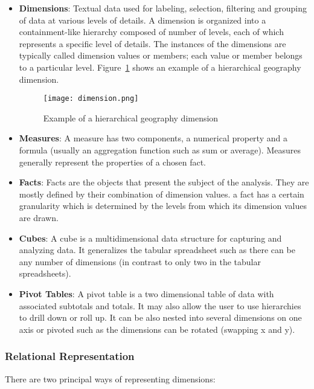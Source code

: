\begin{itemize}
	\item \textbf{Dimensions}: Textual data used for labeling, selection, filtering and grouping of data at various levels of details. A dimension is organized into a containment-like hierarchy composed of number of levels, each of which represents a specific level of details. The instances of the dimensions are typically called dimension values or members; each value or member belongs to a particular level. Figure~\ref{fig:dimension} shows an example of a hierarchical geography dimension.

\begin{figure}[htbp]
\centering
	\texttt{[image: dimension.png]}
	\caption{Example of a hierarchical geography dimension}
	\label{fig:dimension}
\end{figure}

	\item \textbf{Measures}: A measure has two components, a numerical property and a formula (usually an aggregation function such as sum or average). Measures generally represent the properties of a chosen fact.
	\item \textbf{Facts}: Facts are the objects that present the subject of the analysis. They are mostly defined by their combination of dimension values. a fact has a certain granularity which is determined by the levels from which its dimension values are drawn.
	\item \textbf{Cubes}: A cube is a multidimensional data structure for capturing and analyzing data. It generalizes the tabular spreadsheet such as there can be any number of dimensions (in contrast to only two in the tabular spreadsheets).
	\item \textbf{Pivot Tables}: A pivot table is a two dimensional table of data with associated subtotals and totals. It may also allow the user to use hierarchies to drill down or roll up. It can be also nested into several dimensions on one axis or pivoted such as the dimensions can be rotated (swapping x and y).
\end{itemize}

\subsubsection{Relational Representation}

There are two principal ways of representing dimensions:

